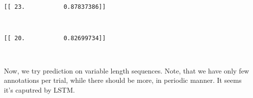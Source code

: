 \documentclass{article}
\begin{document}
    \begin{Verbatim}[commandchars=\\\{\}]
[[ 23.           0.87837386]]
    \end{Verbatim}

    \begin{center}
    \end{center}
    { \hspace*{\fill} \\}
    
    \begin{Verbatim}[commandchars=\\\{\}]
[[ 20.           0.82699734]]
    \end{Verbatim}

    \begin{center}
    \end{center}
    { \hspace*{\fill} \\}
    
    Now, we try prediction on variable length sequences. Note, that we have
only few annotations per trial, while there should be more, in periodic
manner. It seems it's caputred by LSTM.
\end{document}
